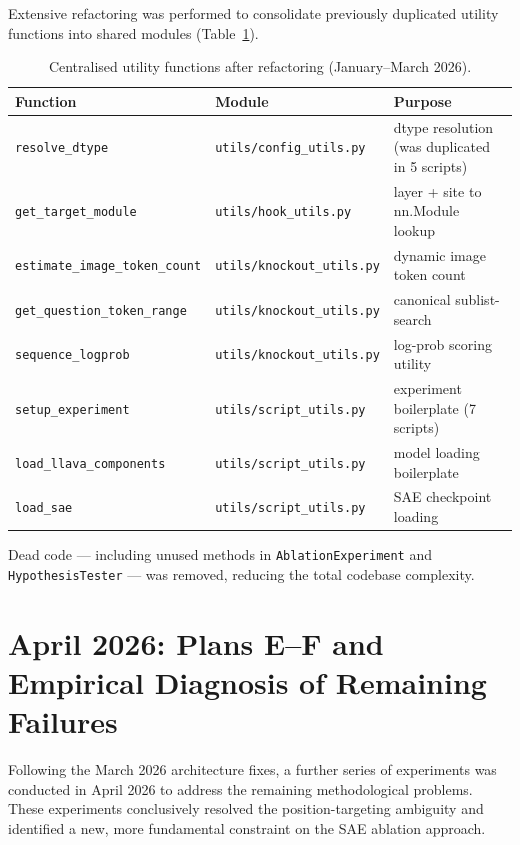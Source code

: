 \documentclass[11pt,a4paper]{article}
\begin{document}
Extensive refactoring was performed to consolidate previously duplicated utility functions
into shared modules (Table~\ref{tab:refactor}).

\begin{table}[ht]
\centering
\caption{Centralised utility functions after refactoring (January--March 2026).}
\label{tab:refactor}
\begin{tabular}{lll}
\toprule
Function & Module & Purpose \\
\midrule
\texttt{resolve\_dtype} & \texttt{utils/config\_utils.py} & dtype resolution (was duplicated in 5 scripts) \\
\texttt{get\_target\_module} & \texttt{utils/hook\_utils.py} & layer + site to nn.Module lookup \\
\texttt{estimate\_image\_token\_count} & \texttt{utils/knockout\_utils.py} & dynamic image token count \\
\texttt{get\_question\_token\_range} & \texttt{utils/knockout\_utils.py} & canonical sublist-search \\
\texttt{sequence\_logprob} & \texttt{utils/knockout\_utils.py} & log-prob scoring utility \\
\texttt{setup\_experiment} & \texttt{utils/script\_utils.py} & experiment boilerplate (7 scripts) \\
\texttt{load\_llava\_components} & \texttt{utils/script\_utils.py} & model loading boilerplate \\
\texttt{load\_sae} & \texttt{utils/script\_utils.py} & SAE checkpoint loading \\
\bottomrule
\end{tabular}
\end{table}

Dead code — including unused methods in \texttt{AblationExperiment} and \texttt{HypothesisTester}
— was removed, reducing the total codebase complexity.

\section{April 2026: Plans E--F and Empirical Diagnosis of Remaining Failures}
\label{sec:april}

Following the March 2026 architecture fixes, a further series of experiments was conducted in April
2026 to address the remaining methodological problems.
These experiments conclusively resolved the position-targeting ambiguity and identified a new,
more fundamental constraint on the SAE ablation approach.
\end{document}
